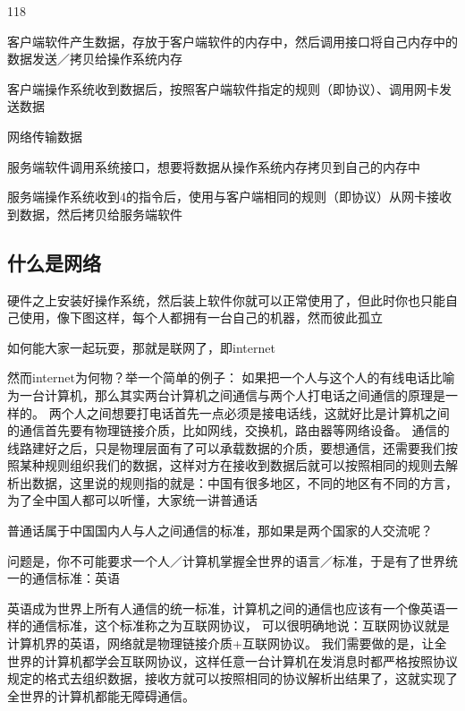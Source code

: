 \documentclass[cn,chinese,color=cyan]{elegantbook}
\begin{document}
\begin{dinglist}{118}
	\item 客户端软件产生数据，存放于客户端软件的内存中，然后调用接口将自己内存中的数据发送／拷贝给操作系统内存
	
	\item 客户端操作系统收到数据后，按照客户端软件指定的规则（即协议）、调用网卡发送数据
	
	\item 网络传输数据
	
	\item 服务端软件调用系统接口，想要将数据从操作系统内存拷贝到自己的内存中
	
	\item 服务端操作系统收到4的指令后，使用与客户端相同的规则（即协议）从网卡接收到数据，然后拷贝给服务端软件
\end{dinglist}

\subsection{什么是网络}

硬件之上安装好操作系统，然后装上软件你就可以正常使用了，但此时你也只能自己使用，像下图这样，每个人都拥有一台自己的机器，然而彼此孤立



如何能大家一起玩耍，那就是联网了，即internet



然而internet为何物？举一个简单的例子： 如果把一个人与这个人的有线电话比喻为一台计算机，那么其实两台计算机之间通信与两个人打电话之间通信的原理是一样的。 两个人之间想要打电话首先一点必须是接电话线，这就好比是计算机之间的通信首先要有物理链接介质，比如网线，交换机，路由器等网络设备。 通信的线路建好之后，只是物理层面有了可以承载数据的介质，要想通信，还需要我们按照某种规则组织我们的数据，这样对方在接收到数据后就可以按照相同的规则去解析出数据，这里说的规则指的就是：中国有很多地区，不同的地区有不同的方言，为了全中国人都可以听懂，大家统一讲普通话



普通话属于中国国内人与人之间通信的标准，那如果是两个国家的人交流呢？



问题是，你不可能要求一个人／计算机掌握全世界的语言／标准，于是有了世界统一的通信标准：英语



英语成为世界上所有人通信的统一标准，计算机之间的通信也应该有一个像英语一样的通信标准，这个标准称之为互联网协议， 可以很明确地说：互联网协议就是计算机界的英语，网络就是物理链接介质+互联网协议。 我们需要做的是，让全世界的计算机都学会互联网协议，这样任意一台计算机在发消息时都严格按照协议规定的格式去组织数据，接收方就可以按照相同的协议解析出结果了，这就实现了全世界的计算机都能无障碍通信。
\end{document}
